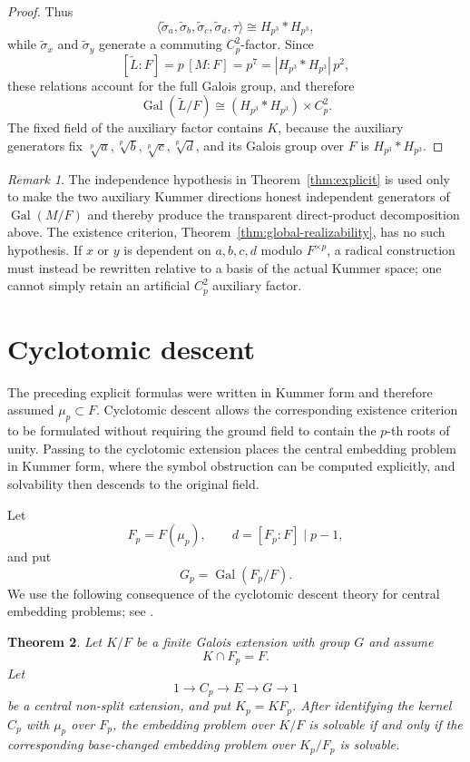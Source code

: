 \documentclass[12pt]{amsart}
\newtheorem{theorem}{Theorem}[section]
\theoremstyle{definition}
\theoremstyle{remark}
\newtheorem{remark}[theorem]{Remark}
\DeclareMathOperator{\Gal}{Gal}
\newcommand{\Hp}{H_{p^3}}
\begin{document}
\begin{proof}
Thus
\[
 \langle\widetilde\sigma_a,\widetilde\sigma_b,
 \widetilde\sigma_c,\widetilde\sigma_d,\tau\rangle
 \cong\Hp*\Hp,
\]
while $\widetilde\sigma_x$ and $\widetilde\sigma_y$ generate a commuting
$C_p^2$-factor. Since
\[
 [\widetilde L:F]=p\,[M:F]=p^7=|\Hp*\Hp|\,p^2,
\]
these relations account for the full Galois group, and therefore
\[
 \Gal(\widetilde L/F)\cong(\Hp*\Hp)\times C_p^2.
\]
The fixed field of the auxiliary factor contains $K$, because the auxiliary
generators fix $\sqrt[p]{a},\sqrt[p]{b},\sqrt[p]{c},\sqrt[p]{d}$, and its
Galois group over $F$ is $\Hp*\Hp$.
\end{proof}

\begin{remark}
The independence hypothesis in Theorem~\ref{thm:explicit} is used only to
make the two auxiliary Kummer directions honest independent generators of
$\Gal(M/F)$ and thereby produce the transparent direct-product decomposition
above. The existence criterion, Theorem~\ref{thm:global-realizability}, has
no such hypothesis. If $x$ or $y$ is dependent on $a,b,c,d$ modulo
$F^{\times p}$, a radical construction must instead be rewritten relative to
a basis of the actual Kummer space; one cannot simply retain an artificial
$C_p^2$ auxiliary factor.
\end{remark}

\section{Cyclotomic descent}

The preceding explicit formulas were written in Kummer form and therefore
assumed $\mu_p\subset F$. Cyclotomic descent allows the corresponding
existence criterion to be formulated without requiring the ground field to
contain the $p$-th roots of unity. Passing to the cyclotomic extension places
the central embedding problem in Kummer form, where the symbol obstruction
can be computed explicitly, and solvability then descends to the original
field.

Let
\[
 F_p=F(\mu_p),
 \qquad
 d=[F_p:F]\mid p-1,
\]
and put
\[
 G_p=\Gal(F_p/F).
\]
We use the following consequence of the cyclotomic descent theory for
central embedding problems; see \cite[Corollary~8.1.5]{Ledet}.

\begin{theorem}\label{thm:descent}
Let $K/F$ be a finite Galois extension with group $G$ and assume
\[
 K\cap F_p=F.
\]
Let
\[
 1\longrightarrow C_p\longrightarrow E\longrightarrow G\longrightarrow1
\]
be a central non-split extension, and put $K_p=KF_p$. After identifying the
kernel $C_p$ with $\mu_p$ over $F_p$, the embedding problem over $K/F$ is
solvable if and only if the corresponding base-changed embedding problem
over $K_p/F_p$ is solvable.
\end{theorem}
\end{document}
